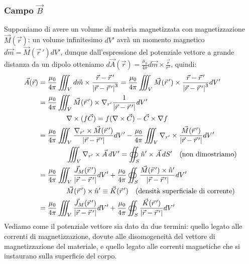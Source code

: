 \subsubsection{Campo $ \vec{B} $}

Supponiamo di avere un volume di materia magnetizzata con magnetizzazione $ \vec{M}(\vec{r}) $: un volume infinitesimo $ dV' $ avrà un momento magnetico $ d\vec{m} = \vec{M}(\vec{r}\,') dV' $, dunque dall'espressione del potenziale vettore a grande distanza da un dipolo otteniamo $ d\vec{A}(\vec{r}) = \frac{\mu_0}{4\pi} d\vec{m}\times \frac{\vec{r}}{r^3} $, quindi:
\begin{equation}
	\begin{split}
		\vec{A}(\vec{r}) &= \frac{\mu_0}{4\pi} \iiint_V d\vec{m} \times \frac{\vec{r}-\vec{r}\,'}{\left\lvert\vec{r}-\vec{r}\,'\right\rvert^3} = \frac{\mu_0}{4\pi} \iiint_V \vec{M}(\vec{r}\,') \times \frac{\vec{r}-\vec{r}\,'}{\left\lvert\vec{r}-\vec{r}\,'\right\rvert^3} dV' \\ 
				 &= \frac{\mu_0}{4\pi} \iiint_V \vec{M}(\vec{r}\,') \times \nabla_{r'} \frac{1}{\left\lvert\vec{r}-\vec{r}\,'\right\rvert} dV' \\ 
				 & \qquad\qquad \nabla\times(f\vec{C}) = f(\nabla\times\vec{C}) - \vec{C}\times\nabla f \\ 
				 &= \frac{\mu_0}{4\pi} \iiint_V \frac{\nabla_{r'}\times\vec{M}(\vec{r}\,')}{\left\lvert\vec{r}-\vec{r}\,'\right\rvert} dV' - \frac{\mu_0}{4\pi} \iiint_V \nabla_{r'} \times \frac{\vec{M}(\vec{r}\,')}{\left\lvert\vec{r}-\vec{r}\,'\right\rvert} dV' \\ 
				 & \qquad\qquad \iiint_V \nabla_{r'}\times\vec{A} \,dV' = \oiint_S \hat{n}' \times\vec{A} \,dS' \quad (\text{non dimostriamo}) \\ 
				 &= \frac{\mu_0}{4\pi} \iiint_V \frac{\vec{J}_M(\vec{r}\,')}{\left\lvert\vec{r}-\vec{r}\,'\right\rvert} dV' + \frac{\mu_0}{4\pi} \oiint_S \frac{\vec{M}(\vec{r}\,') \times \hat{n}'}{\left\lvert\vec{r}-\vec{r}\,'\right\rvert} dV' \\ 
				 & \qquad\qquad \vec{M}(\vec{r}\,') \times \hat{n}' \equiv \vec{K}(\vec{r}\,') \quad (\text{densità superficiale di corrente}) \\ 
				 &= \frac{\mu_0}{4\pi} \iiint_V \frac{\vec{J}_M(\vec{r}\,')}{\left\lvert\vec{r}-\vec{r}\,'\right\rvert} dV' + \frac{\mu_0}{4\pi} \oiint_S \frac{\vec{K}(\vec{r}\,')}{\left\lvert\vec{r}-\vec{r}\,'\right\rvert} dV'
	\end{split}
	\label{eq:14}
\end{equation}
Vediamo come il potenziale vettore sia dato da due termini: quello legato alle correnti di magnetizzazione, dovute alle disomogeneità del vettore di magnetizzazione del materiale, e quello legato alle correnti magnetiche che si instaurano sulla superficie del corpo.

